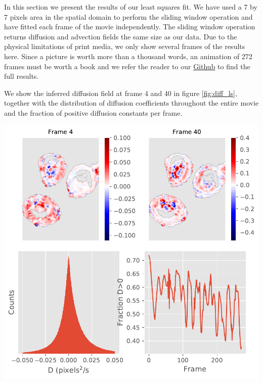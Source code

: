 \documentclass{Dissertate}
\let\origfigure\figure
\let\endorigfigure\endfigure
\renewenvironment{figure}[1][2] {
    \expandafter\origfigure\expandafter[H]
} {
    \endorigfigure
}
\begin{document}
In this section we present the results of our least squares fit. We have used
a 7 by 7 pixels area in the spatial domain to perform the sliding window
operation and have fitted each frame of the movie independently. The sliding window operation returns diffusion and advection fields the same size as our data. Due to the physical limitations of print media, we only show several frames of the results here. Since a picture is worth more than a thousand words, an animation of 272 frames must be worth a book and we refer the reader to our \href{https://github.com/GJBoth/Masters-thesis}{Github} to find the full results.

We show the inferred diffusion field at frame 4 and 40 in figure \ref{fig:diff_ls}, together with the distribution of diffusion coefficients throughout the entire movie and the fraction of positive diffusion constants per frame. 

\begin{figure}
\hypertarget{fig:diff_ls}{%
\centering
\includegraphics{source/figures/pdf/Diff.pdf}
\caption{Analysis of the inferred diffusion field. The upper row shows
the inferred field at two frames, while the lower row shows the
distribution of values and the fraction of physical values as a function
of time.}\label{fig:diff_ls}
}
\end{figure}
\end{document}
